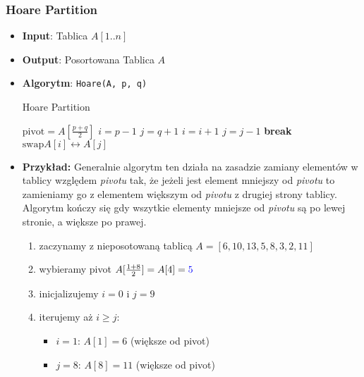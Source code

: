 \documentclass[11pt,a4paper]{article}
\begin{document}
\subsubsection{Hoare Partition}
\begin{itemize}
    \item \textbf{Input}: Tablica $A[1..n]$
    \item \textbf{Output}: Posortowana Tablica $A$
    \item \textbf{Algorytm}: \texttt{Hoare(A, p, q)}
        \begin{algorithm}
            \caption{Hoare Partition}
            \begin{algorithmic}[1]
                \State $\text{pivot} = A[\frac{p+q}{2}]$
                \State $i = p-1$
                \State $j = q+1$
                \State $i = i + 1$
                \State $j = j - 1$
                \State \textbf{break}
                \EndIf
                \EndWhile
                \State $\text{swap} A[i] \leftrightarrow A[j]$
                \EndWhile
                \EndProcedure
            \end{algorithmic}
        \end{algorithm}
    \item \textbf{Przykład:}
        Generalnie algorytm ten działa na zasadzie zamiany elementów w tablicy względem \textit{pivotu} tak, że jeżeli jest element mniejszy od \textit{pivotu} to zamieniamy go z elementem większym od \textit{pivotu} z drugiej strony tablicy. Algorytm kończy się gdy wszytkie elementy mniejsze od \textit{pivotu} są po lewej stronie, a większe po prawej.
        \begin{enumerate}
            \item zaczynamy z nieposotowaną tablicą $A = [6,10,13,5,8,3,2,11]$
                 \item wybieramy pivot $A[\frac{1+8}{2}] = A[4] = \textcolor{blue}{5}$
            \item inicjalizujemy $i = 0$ i $j = 9$
            \item iterujemy aż $i \geq j$:
                \begin{itemize}
                    \item $i = 1$: $A[1] = 6$ (większe od pivot)
                    \item $j = 8$: $A[8] = 11$ (większe od pivot)
                        \begin{itemize}

\end{itemize}
\end{itemize}
\end{enumerate}
\end{itemize}
\end{document}

